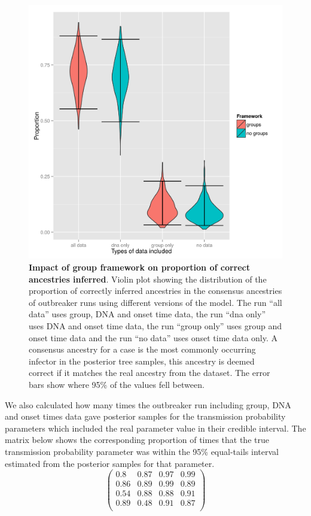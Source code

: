 \documentclass[11pt,a4paper]{report}
\begin{document}
\begin{figure}
\centering
\includegraphics[scale=0.6]{final.png}
\newline
\caption{{\bf Impact of group framework on proportion of correct ancestries inferred}. Violin plot showing the distribution of the proportion of correctly inferred ancestries in the consensus ancestries of outbreaker runs using different versions of the model. The run ``all data'' uses group, DNA and onset time data, the run ``dna only'' uses DNA and onset time data, the run ``group only'' uses group and onset time data and the run ``no data'' uses onset time data only. A consensus ancestry for a case is the most commonly occurring infector in the posterior tree samples, this ancestry is deemed correct if it matches the real ancestry from the dataset. The error bars show where 95\% of the values fell between.}

\end{figure}

We also calculated how many times the outbreaker run including group, DNA and onset times data gave posterior samples for the transmission probability parameters which included the real parameter value in their credible interval. The matrix below shows the corresponding proportion of times that the true transmission probability parameter was within the 95\% equal-tails interval estimated from the posterior samples for that parameter.
\begin{equation}
\begin{pmatrix}
0.8 & 0.87 & 0.97 & 0.99 \\
0.86 & 0.89 & 0.99 & 0.89 \\
0.54 & 0.88 & 0.88 & 0.91 \\
0.89 & 0.48 & 0.91 & 0.87 \\
\end{pmatrix}
\end{equation}
\end{document}
